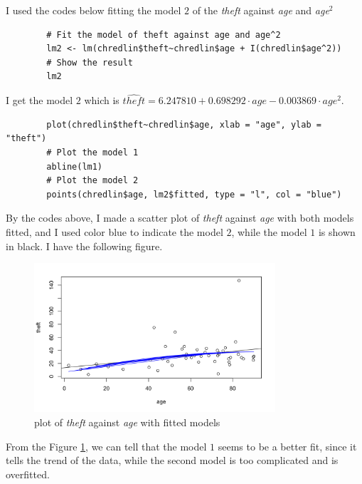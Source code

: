 \begin{answer}
    I used the codes below fitting the model $2$ of the \textit{theft} against \textit{age} and \textit{age${}^2$}
    \begin{verbatim}
        # Fit the model of theft against age and age^2
        lm2 <- lm(chredlin$theft~chredlin$age + I(chredlin$age^2))
        # Show the result
        lm2
    \end{verbatim}
    I get the model $2$ which is $\widehat{theft} = 6.247810 + 0.698292 \cdot age - 0.003869 \cdot {age}^2$.
    \begin{verbatim}
        plot(chredlin$theft~chredlin$age, xlab = "age", ylab = "theft")
        # Plot the model 1
        abline(lm1)
        # Plot the model 2
        points(chredlin$age, lm2$fitted, type = "l", col = "blue")
    \end{verbatim}
    By the codes above, I made a scatter plot of \textit{theft} against \textit{age} with both models fitted, and I used color blue to indicate the model $2$, while the model $1$ is shown in black. I have the following figure.
    \begin{figure}[H]
        \centering
        \includegraphics[width=0.8\textwidth]{Figure 3.png}
        \caption{\label{fig:fig3}plot of \textit{theft} against \textit{age} with fitted models}
    \end{figure}
    From the Figure \ref{fig:fig3}, we can tell that the model $1$ seems to be a better fit, since it tells the trend of the data, while the second model is too complicated and is overfitted.
\end{answer}
